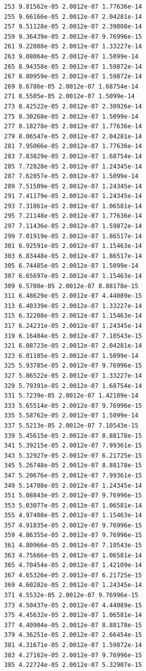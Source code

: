 \documentclass{article}
\begin{document}
\begin{verbatim}
253 9.81562e-05 2.0012e-07 1.77636e-14
255 9.66166e-05 2.0012e-07 2.04281e-14
257 9.51128e-05 2.0012e-07 2.39808e-14
259 9.36439e-05 2.0012e-07 9.76996e-15
261 9.22088e-05 2.0012e-07 1.33227e-14
263 9.08064e-05 2.0012e-07 1.5099e-14
265 8.94358e-05 2.0012e-07 1.59872e-14
267 8.80959e-05 2.0012e-07 1.59872e-14
269 8.6786e-05 2.0012e-07 1.68754e-14
271 8.5505e-05 2.0012e-07 1.5099e-14
273 8.42522e-05 2.0012e-07 2.30926e-14
275 8.30268e-05 2.0012e-07 1.5099e-14
277 8.18278e-05 2.0012e-07 1.77636e-14
279 8.06547e-05 2.0012e-07 2.04281e-14
281 7.95066e-05 2.0012e-07 1.77636e-14
283 7.83829e-05 2.0012e-07 1.68754e-14
285 7.72828e-05 2.0012e-07 1.24345e-14
287 7.62057e-05 2.0012e-07 1.5099e-14
289 7.51509e-05 2.0012e-07 1.24345e-14
291 7.41179e-05 2.0012e-07 1.24345e-14
293 7.31061e-05 2.0012e-07 1.06581e-14
295 7.21148e-05 2.0012e-07 1.77636e-14
297 7.11436e-05 2.0012e-07 1.59872e-14
299 7.01919e-05 2.0012e-07 1.86517e-14
301 6.92591e-05 2.0012e-07 1.15463e-14
303 6.83448e-05 2.0012e-07 1.86517e-14
305 6.74485e-05 2.0012e-07 1.5099e-14
307 6.65697e-05 2.0012e-07 1.15463e-14
309 6.5708e-05 2.0012e-07 8.88178e-15
311 6.48629e-05 2.0012e-07 4.44089e-15
313 6.40339e-05 2.0012e-07 1.33227e-14
315 6.32208e-05 2.0012e-07 1.15463e-14
317 6.24231e-05 2.0012e-07 1.24345e-14
319 6.16404e-05 2.0012e-07 7.10543e-15
321 6.08723e-05 2.0012e-07 2.04281e-14
323 6.01185e-05 2.0012e-07 1.5099e-14
325 5.93785e-05 2.0012e-07 9.76996e-15
327 5.86522e-05 2.0012e-07 1.33227e-14
329 5.79391e-05 2.0012e-07 1.68754e-14
331 5.7239e-05 2.0012e-07 1.42109e-14
333 5.65514e-05 2.0012e-07 9.76996e-15
335 5.58762e-05 2.0012e-07 1.5099e-14
337 5.5213e-05 2.0012e-07 7.10543e-15
339 5.45615e-05 2.0012e-07 8.88178e-15
341 5.39215e-05 2.0012e-07 7.99361e-15
343 5.32927e-05 2.0012e-07 6.21725e-15
345 5.26748e-05 2.0012e-07 8.88178e-15
347 5.20676e-05 2.0012e-07 7.99361e-15
349 5.14708e-05 2.0012e-07 1.24345e-14
351 5.08843e-05 2.0012e-07 9.76996e-15
353 5.03077e-05 2.0012e-07 1.06581e-14
355 4.97408e-05 2.0012e-07 1.15463e-14
357 4.91835e-05 2.0012e-07 9.76996e-15
359 4.86355e-05 2.0012e-07 9.76996e-15
361 4.80966e-05 2.0012e-07 7.10543e-15
363 4.75666e-05 2.0012e-07 1.06581e-14
365 4.70454e-05 2.0012e-07 1.42109e-14
367 4.65326e-05 2.0012e-07 6.21725e-15
369 4.60282e-05 2.0012e-07 1.24345e-14
371 4.5532e-05 2.0012e-07 9.76996e-15
373 4.50437e-05 2.0012e-07 4.44089e-15
375 4.45632e-05 2.0012e-07 1.06581e-14
377 4.40904e-05 2.0012e-07 8.88178e-15
379 4.36251e-05 2.0012e-07 2.66454e-15
381 4.31671e-05 2.0012e-07 1.59872e-14
383 4.27162e-05 2.0012e-07 9.76996e-15
385 4.22724e-05 2.0012e-07 5.32907e-15

\end{verbatim}
\end{document}
